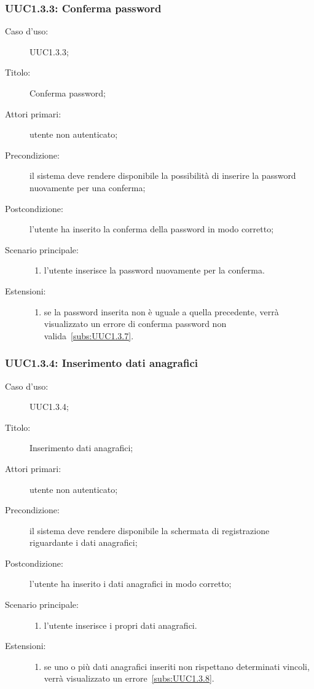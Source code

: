 \documentclass[../../../analisi-dei-requisiti.tex]{subfiles}
\begin{document}
\subsubsection{UUC1.3.3: Conferma password}%
\label{subs:UUC1.3.3}
\begin{description}
  \item[Caso d’uso:] UUC1.3.3;
  \item[Titolo:] Conferma password;
  \item[Attori primari:] utente non autenticato;
  \item[Precondizione:] il sistema deve rendere disponibile la possibilità di inserire la password nuovamente per una conferma;
  \item[Postcondizione:] l'utente ha inserito la conferma della password in modo corretto;
  \item[Scenario principale:]
        \begin{enumerate}
          \item l'utente inserisce la password nuovamente per la conferma.
        \end{enumerate}
  \item[Estensioni:]
        \begin{enumerate}
          \item se la password inserita non è uguale a quella precedente, verrà visualizzato un errore di conferma password non valida~\ref{subs:UUC1.3.7}.
        \end{enumerate}
\end{description}



\subsubsection{UUC1.3.4: Inserimento dati anagrafici}%
\label{subs:UUC1.3.4}
\begin{description}
  \item[Caso d’uso:] UUC1.3.4;
  \item[Titolo:] Inserimento dati anagrafici;
  \item[Attori primari:] utente non autenticato;
  \item[Precondizione:] il sistema deve rendere disponibile la schermata di registrazione riguardante i dati anagrafici;
  \item[Postcondizione:] l'utente ha inserito i dati anagrafici in modo corretto;
  \item[Scenario principale:]
        \begin{enumerate}
          \item l'utente inserisce i propri dati anagrafici.
        \end{enumerate}
  \item[Estensioni:]
        \begin{enumerate}
          \item se uno o più dati anagrafici inseriti non rispettano determinati vincoli, verrà visualizzato un errore~\ref{subs:UUC1.3.8}.
        \end{enumerate}
\end{description}
\end{document}
